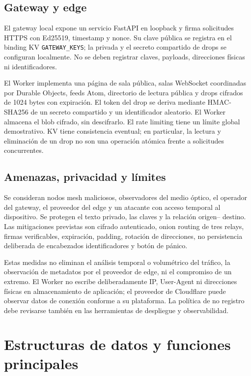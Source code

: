 \documentclass[12pt,a4paper]{article}
\begin{document}
\subsection{Gateway y edge}
El gateway local expone un servicio FastAPI en loopback y firma solicitudes
HTTPS con Ed25519, timestamp y nonce. Su clave pública se registra en el
binding KV \texttt{GATEWAY\_KEYS}; la privada y el secreto compartido de drops
se configuran localmente. No se deben registrar claves, payloads, direcciones
físicas ni identificadores.

El Worker implementa una página de sala pública, salas WebSocket coordinadas
por Durable Objects, feeds Atom, directorio de lectura pública y drops
cifrados de 1024 bytes con expiración. El token del drop se deriva mediante
HMAC-SHA256 de un secreto compartido y un identificador aleatorio. El Worker
almacena el blob cifrado, sin descifrarlo. El rate limiting tiene un límite
global demostrativo. KV tiene consistencia eventual; en particular, la lectura
y eliminación de un drop no son una operación atómica frente a solicitudes
concurrentes.

\subsection{Amenazas, privacidad y límites}
Se consideran nodos mesh maliciosos, observadores del medio óptico, el operador
del gateway, el proveedor del edge y un atacante con acceso temporal al
dispositivo. Se protegen el texto privado, las claves y la relación origen--
destino. Las mitigaciones previstas son cifrado autenticado, onion routing de
tres relays, firmas verificables, expiración, padding, rotación de direcciones,
no persistencia deliberada de encabezados identificadores y botón de pánico.

Estas medidas no eliminan el análisis temporal o volumétrico del tráfico, la
observación de metadatos por el proveedor de edge, ni el compromiso de un
extremo. El Worker no escribe deliberadamente IP, User-Agent ni direcciones
físicas en almacenamiento de aplicación; el proveedor de Cloudflare puede
observar datos de conexión conforme a su plataforma. La política de no
registro debe revisarse también en las herramientas de despliegue y
observabilidad.

\section{Estructuras de datos y funciones principales}
\end{document}
